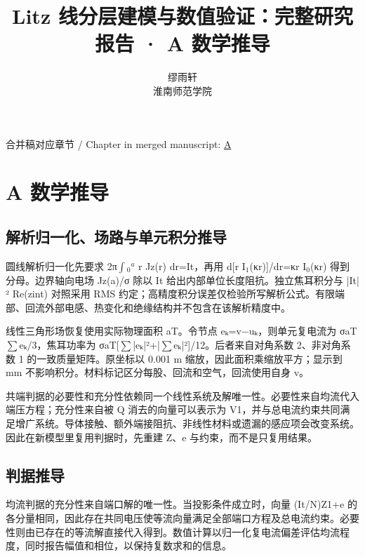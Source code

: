 \documentclass[11pt]{article}
\begin{document}
\title{Litz 线分层建模与数值验证：完整研究报告 · A 数学推导}
\author{缪雨轩\\淮南师范学院}
\date{}
\maketitle
\noindent 合并稿对应章节 / Chapter in merged manuscript: \href{report_zh-CN_single.pdf#chapter-A}{A}\par
\FloatBarrier
\section*{A 数学推导}
\hypertarget{chapter-A}{}
\subsection*{解析归一化、场路与单元积分推导}
\hypertarget{A.report_derivation.heading}{}
圆线解析归一化先要求 2π\(\int\)\(_0\)\(^a\) r Jz(r) dr=It，再用 d[r I\(_1\)(κr)]/dr=κr I\(_0\)(κr) 得到分母。边界轴向电场 Jz(a)/σ 除以 It 给出内部单位长度阻抗。独立焦耳积分与 |It|² Re(zint) 对照采用 RMS 约定；高精度积分误差仅检验所写解析公式。有限端部、回流外部电感、热变化和绝缘结构并不包含在该解析精度中。


线性三角形场恢复使用实际物理面积 aT。令节点 eₖ=v−uₖ，则单元复电流为 σaT\(\sum\)eₖ/3，焦耳功率为 σaT[\(\sum\)|eₖ|²+|\(\sum\)eₖ|²]/12。后者来自对角系数 2、非对角系数 1 的一致质量矩阵。原坐标以 0.001 m 缩放，因此面积乘缩放平方；显示到 mm 不影响积分。材料标记区分每股、回流和空气，回流使用自身 v。


共端判据的必要性和充分性依赖同一个线性系统及解唯一性。必要性来自均流代入端压方程；充分性来自被 Q 消去的向量可以表示为 V1，并与总电流约束共同满足增广系统。导体接触、额外端接阻抗、非线性材料或遗漏的感应项会改变系统。因此在新模型里复用判据时，先重建 Z、e 与约束，而不是只复用结果。


\subsection*{判据推导}
\hypertarget{A.sharing_derivation.heading}{}
均流判据的充分性来自端口解的唯一性。当投影条件成立时，向量 (It/N)Z1+e 的各分量相同，因此存在共同电压使等流向量满足全部端口方程及总电流约束。必要性则由已存在的等流解直接代入得到。数值计算以归一化复电流偏差评估均流程度，同时报告幅值和相位，以保持复数求和的信息。
\end{document}
